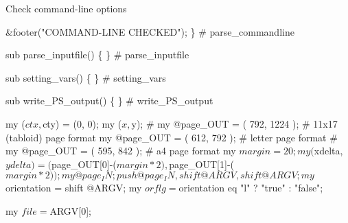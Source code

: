 \documentclass[11pt]{article}
\def\nwendcode{\endtrivlist \endgroup} %
\let\nwdocspar=\par                    %
\begin{document}
    \LA{}Check command-line options~{\nwtagstyle{}}\RA{}

    &footer("COMMAND-LINE CHECKED");
\} # parse_commandline
\nwendcode{}\nwdocspar

\nwenddocs{}\plusendmoddef
sub parse_inputfile() \{
\} # parse_inputfile
\nwendcode{}\nwdocspar

\nwenddocs{}\plusendmoddef
sub setting_vars() \{
\} # setting_vars
\nwendcode{}\nwdocspar

\nwenddocs{}\plusendmoddef
sub write_PS_output() \{
\} # write_PS_output
\nwendcode{}\nwdocspar

\nwenddocs{}\plusendmoddef
my ($ctx, $cty) = (0, 0);
my ($x, $y);
# my @page_OUT = (  792,  1224 ); # 11x17 (tabloid) page format
my @page_OUT = (  612,  792 ); # letter page format
# my @page_OUT = (  595,  842 ); # a4 page format
my $margin = 20;
my ($xdelta, $ydelta) = ($page_OUT[0]-($margin * 2), $page_OUT[1]-($margin * 2));

my @page_IN;
push @page_IN, shift @ARGV, shift @ARGV;

my $orientation = shift @ARGV;
my $orflg = $orientation eq "l" ? "true" : "false";

my $file = $ARGV[0];
\end{document}
